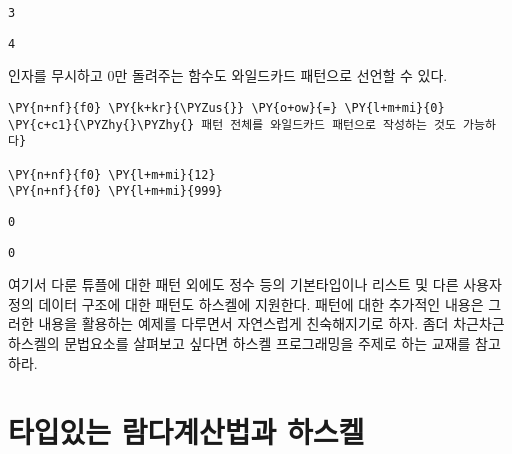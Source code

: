     
    \begin{Verbatim}[commandchars=\\\{\}]
3
    \end{Verbatim}

    
    
    \begin{Verbatim}[commandchars=\\\{\}]
4
    \end{Verbatim}

    
    \noindent 인자를 무시하고 0만 돌려주는 함수도 와일드카드 패턴으로 선언할
수 있다.

    \begin{tcolorbox}[breakable, size=fbox, boxrule=1pt, pad at break*=1mm,colback=cellbackground, colframe=cellborder, top=.75ex]
\begin{Verbatim}[commandchars=\\\{\}]
\PY{n+nf}{f0} \PY{k+kr}{\PYZus{}} \PY{o+ow}{=} \PY{l+m+mi}{0}   \PY{c+c1}{\PYZhy{}\PYZhy{} 패턴 전체를 와일드카드 패턴으로 작성하는 것도 가능하다}

\PY{n+nf}{f0} \PY{l+m+mi}{12}
\PY{n+nf}{f0} \PY{l+m+mi}{999}
\end{Verbatim}
\end{tcolorbox}

    
    \begin{Verbatim}[commandchars=\\\{\}]
0
    \end{Verbatim}

    
    
    \begin{Verbatim}[commandchars=\\\{\}]
0
    \end{Verbatim}

    
    여기서 다룬 튜플에 대한 패턴 외에도 정수 등의 기본타입이나 리스트 및
다른 사용자 정의 데이터 구조에 대한 패턴도 하스켈에 지원한다. 패턴에
대한 추가적인 내용은 그러한 내용을 활용하는 예제를 다루면서 자연스럽게
친숙해지기로 하자. 좀더 차근차근 하스켈의 문법요소를 살펴보고 싶다면
하스켈 프로그래밍을 주제로 하는 교재\cite{Hutton2016pih2nd}를 참고하라.

    \hypertarget{uxd0c0uxc785uxc788uxb294-uxb78cuxb2e4uxacc4uxc0b0uxbc95uxacfc-uxd558uxc2a4uxcf08}{%
\section{타입있는 람다계산법과
하스켈}\label{uxd0c0uxc785uxc788uxb294-uxb78cuxb2e4uxacc4uxc0b0uxbc95uxacfc-uxd558uxc2a4uxcf08}}

